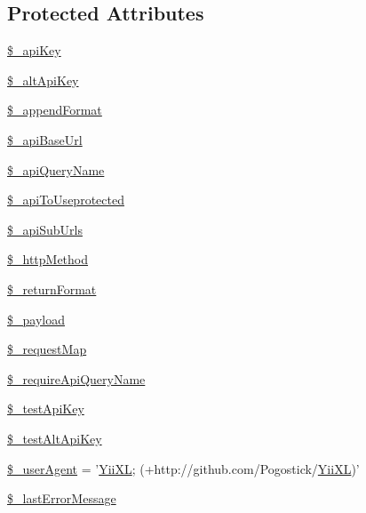 \subsection*{Protected Attributes}
\begin{DoxyCompactItemize}
\item 
\hyperlink{classCXLRestConsumerComponent_a30d859488ed1921f08a7e8191363d9a4}{\$\_\-apiKey}
\item 
\hyperlink{classCXLRestConsumerComponent_a3bb30fd55481cc30ef96aa61d1b523b6}{\$\_\-altApiKey}
\item 
\hyperlink{classCXLRestConsumerComponent_ae027f791b6a2fc198dfabc3e2693f585}{\$\_\-appendFormat}
\item 
\hyperlink{classCXLRestConsumerComponent_a2a3098653897c46b33497dd90b807f64}{\$\_\-apiBaseUrl}
\item 
\hyperlink{classCXLRestConsumerComponent_adb92b727d9e245493a2001eca37693de}{\$\_\-apiQueryName}
\item 
\hyperlink{classCXLRestConsumerComponent_abdfb5848bea7acb66e39972358f344a8}{\$\_\-apiToUseprotected}
\item 
\hyperlink{classCXLRestConsumerComponent_aee5e6cb1a983f0bd5f57cefdd5a97241}{\$\_\-apiSubUrls}
\item 
\hyperlink{classCXLRestConsumerComponent_a1fa7e8f053c645c627f16bcf41f2416a}{\$\_\-httpMethod}
\item 
\hyperlink{classCXLRestConsumerComponent_a7ea52a3850e51717b6268b7b9e468684}{\$\_\-returnFormat}
\item 
\hyperlink{classCXLRestConsumerComponent_a01bc135256923b2605138f01e3f81d76}{\$\_\-payload}
\item 
\hyperlink{classCXLRestConsumerComponent_ae2824a887a5fbea2092a494eac8471bb}{\$\_\-requestMap}
\item 
\hyperlink{classCXLRestConsumerComponent_ab068ac6d8ffe672d108a88b51f766294}{\$\_\-requireApiQueryName}
\item 
\hyperlink{classCXLRestConsumerComponent_a539fd69c22d2f9c368e410d3542cd5a6}{\$\_\-testApiKey}
\item 
\hyperlink{classCXLRestConsumerComponent_a043b72271c216d07a270d5b57a17fe59}{\$\_\-testAltApiKey}
\item 
\hyperlink{classCXLRestConsumerComponent_a901ed68c5b7f6b758cc90b00197ca88b}{\$\_\-userAgent} = '\hyperlink{classYiiXL}{YiiXL}; (+http://github.com/Pogostick/\hyperlink{classYiiXL}{YiiXL})'
\item 
\hyperlink{classCXLRestConsumerComponent_a204d1af51663d8a1317949e796fe5fca}{\$\_\-lastErrorMessage}

\end{DoxyCompactItemize}
